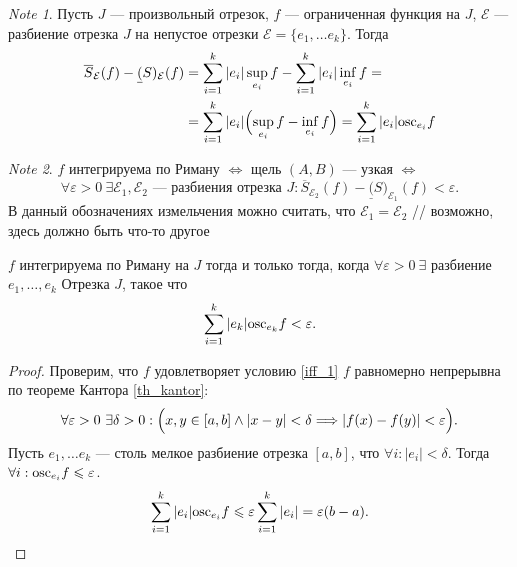 \documentclass[11pt]{book}
\newcommand{\slim}{\sum\limits}
\newcommand{\osc}{{\mathop{\text{\rm osc}}}}
\renewcommand{\le}{\leqslant}
\theoremstyle{definition}
\theoremstyle{plain}
\theoremstyle{plain}
\theoremstyle{definition}
\theoremstyle{remark}
\newtheorem*{note}{Note}
\begin{document}
\begin{note}
    Пусть $ J$ --- произвольный отрезок, $ f$ --- ограниченная функция на $ J$, $ \mathcal{E}$ --- разбиение отрезка $ J  $ на непустое отрезки $ \mathcal{E} =\{e_1, \ldots  e_k\}$.
    Тогда
    \begin{align*}
	\overline{S}_{\mathcal{E}}(f)  - \underline(S)_{\mathcal{E}}(f) &= \sum_{i=1}^{k} |e_i|\sup_{e_i}f  - \sum_{i=1}^{k}|e_i|\inf_{e_i}f = \\
									&= \sum_{i=1}^{k}|e_i|\Bigl( \sup_{e_i} f - \inf_{e_i}f\Bigr) = \sum_{i=1}^{k} |e_i| \osc_{e_i}f
    \end{align*}
\end{note}
\begin{note}
    $ f$ интегрируема по Риману  $ \Longleftrightarrow $  щель $ (A, B)$ --- узкая $ \Longleftrightarrow $
    \[
	\forall \varepsilon >0 ~ \exists  \mathcal{E}_1, \mathcal{E}_2 \text{ --- разбиения отрезка } J: \overline{S}_{\mathcal{E}_2}(f)  - \underline(S)_{\mathcal{E}_1}(f)  < \varepsilon
    .\]
    В данный обозначениях измельчения можно считать, что $ \mathcal{E}_1 = \mathcal{E}_2$
    // возможно, здесь должно быть что-то другое
\end{note}
\begin{thm}
    $ f$   интегрируема по Риману на $ J$ тогда и только тогда, когда $ \forall  \varepsilon >0 ~ \exists $ разбиение $ e_1, \ldots,  e_k$ Отрезка $ J$, такое что
    \begin{align}
	\slim_{i=1}^{k}|e_k| \osc_{e_k} f < \varepsilon . \label{iff_1}
    \end{align}
\end{thm}
\begin{proof}
    Проверим, что $ f$ удовлетворяет условию  \ref{iff_1}
    $ f$ равномерно непрерывна по теореме Кантора \ref{th_kantor}:
    \[
	\forall 	\varepsilon >0 ~ \exists \delta  >0: \Bigl( x, y \in  [a, b] \wedge  |x-y| < \delta  \Longrightarrow  |f(x) - f(y)| < \varepsilon  \Bigr)
    .\] 
    Пусть $ e_1, \ldots e_k$ --- столь мелкое разбиение отрезка $ [a, b]$, что $ \forall i: |e_i| < \delta $. Тогда  $ \forall i: \osc_{e_i}f \le \varepsilon $.
    \[
	\sum_{i=1}^{k} |e_i|\osc_{e_i} f \le \varepsilon \sum_{i=1}^{k}|e_i| = \varepsilon (b-a) 
    .\] 
\end{proof}
\end{document}
